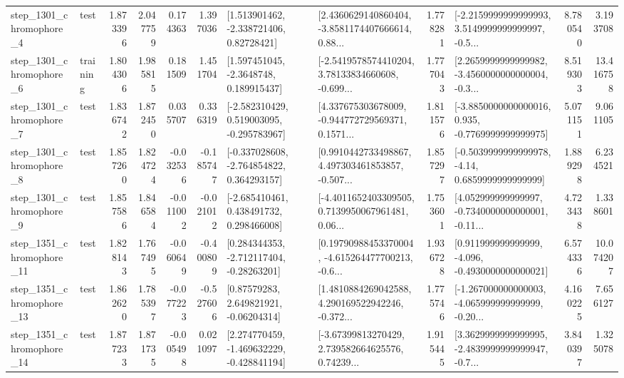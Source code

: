 \begin{tabular}{llrrrrllrlrr}
  step\_1301\_chromophore\_4 &      test &      1.873396 &    2.047759 &      0.174363 &  1.397036 &     [1.513901462, -2.338721406, 0.82728421] &  [2.4360629140860404, -3.8581174407666614, 0.88... &       1.778281 &  [-2.2159999999999993, 3.5149999999999997, -0.5... &            8.780540 &          3.193708 \\
  step\_1301\_chromophore\_6 &  training &      1.804306 &    1.985815 &      0.181509 &  1.451704 &      [1.597451045, -2.3648748, 0.189915437] &  [-2.5419578574410204, 3.78133834660608, -0.699... &       1.777043 &  [2.2659999999999982, -3.4560000000000004, -0.3... &            8.519303 &         13.416758 \\
  step\_1301\_chromophore\_7 &      test &      1.836742 &    1.872450 &      0.035707 &  0.336319 &   [-2.582310429, 0.519003095, -0.295783967] &  [4.337675303678009, -0.944772729569371, 0.1571... &       1.811576 &  [-3.8850000000000016, 0.935, -0.7769999999999975] &            5.071151 &          9.061105 \\
  step\_1301\_chromophore\_8 &      test &      1.857260 &    1.824724 &     -0.032536 & -0.185747 &   [-0.337028608, -2.764854822, 0.364293157] &  [0.9910442733498867, 4.497303461853857, -0.507... &       1.857297 &   [-0.5039999999999978, -4.14, 0.6859999999999999] &            1.889298 &          6.234521 \\
  step\_1301\_chromophore\_9 &      test &      1.857586 &    1.846584 &     -0.011002 & -0.021012 &    [-2.685410461, 0.438491732, 0.298466008] &  [-4.4011652403309505, 0.7139950067961481, 0.06... &       1.753601 &  [4.052999999999997, -0.7340000000000001, -0.11... &            4.723438 &          1.338601 \\
 step\_1351\_chromophore\_11 &      test &      1.828143 &    1.767495 &     -0.060649 & -0.400809 &    [0.284344353, -2.712117404, -0.28263201] &  [0.19790988453370004, -4.615264477700213, -0.6... &       1.936728 &   [0.911999999999999, -4.096, -0.4930000000000021] &            6.574336 &         10.074207 \\
 step\_1351\_chromophore\_13 &      test &      1.862620 &    1.785397 &     -0.077223 & -0.527606 &      [0.87579283, 2.649821921, -0.06204314] &  [1.4810884269042588, 4.290169522942246, -0.372... &       1.775746 &  [-1.267000000000003, -4.065999999999999, -0.20... &            4.160225 &          7.656127 \\
 step\_1351\_chromophore\_14 &      test &      1.877233 &    1.871735 &     -0.005498 &  0.021097 &   [2.274770459, -1.469632229, -0.428841194] &  [-3.67399813270429, 2.739582664625576, 0.74239... &       1.915445 &  [3.3629999999999995, -2.4839999999999947, -0.7... &            3.840397 &          1.325078 \\

\end{tabular}
